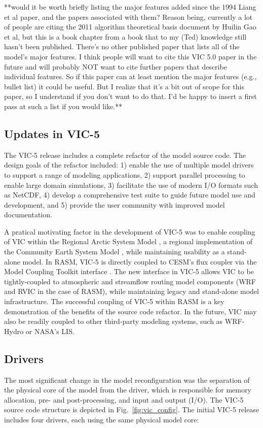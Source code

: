 \documentclass[gmd, manuscript]{copernicus}
\begin{document}
**would it be worth briefly listing the major features added since the 1994 Liang et al paper, and the papers associated with them?  Reason being, currently a lot of people are citing the 2011 algorithm theoretical basis document by Huilin Gao et al, but this is a book chapter from a book that to my (Ted) knowledge still hasn't been published.  There's no other published paper that lists all of the model's major features.  I think people will want to cite this VIC 5.0 paper in the future and will probably NOT want to cite further papers that describe individual features.  So if this paper can at least mention the major features (e.g., bullet list) it could be useful.  But I realize that it's a bit out of scope for this paper, so I understand if you don't want to do that.  I'd be happy to insert a first pass at such a list if you would like.**

  \subsection{Updates in VIC-5}
    \label{sec:vic-5}
    The VIC-5 release includes a complete refactor of the model source code. The design goals of the refactor included: 1) enable the use of multiple model drivers to support a range of modeling applications, 2) support parallel processing to enable large domain simulations, 3) facilitate the use of modern I/O formats such as NetCDF, 4) develop a comprehensive test suite to guide future model use and development, and 5) provide the user community with improved model documentation.

    A pratical motivating factor in the development of VIC-5 was to enable coupling of VIC within the Regional Arctic System Model \citep[RASM;][]{Hamman_2016a}, a regional implementation of the Community Earth System Model \citep[CESM;][]{Hurrell_2013}, while maintaining usability as a stand-alone model. In RASM, VIC-5 is directly coupled to CESM's flux coupler \citep[CPL7;][]{Craig_2012} via the Model Coupling Toolkit interface \citep[MCT;][]{Larson_2005}. The new interface in VIC-5 allows VIC to be tightly-coupled to atmospheric and streamflow routing model components (WRF and RVIC in the case of RASM), while maintaining legacy and stand-alone model infrastructure. The successful coupling of VIC-5 within RASM is a key demonstration of the benefits of the source code refactor. In the future, VIC may also be readily coupled to other third-party modeling systems, such as WRF-Hydro or NASA's LIS.

  \subsection{Drivers}
    \label{sec:drivers}
    The most significant change in the model reconfiguration was the separation of the physical core of the model from the driver, which is responsible for memory allocation, pre- and post-processing, and input and output (I/O). The VIC-5 source code structure is depicted in Fig.~\ref{fig:vic_config}. The initial VIC-5 release includes four drivers, each using the same physical model core:
\end{document}
